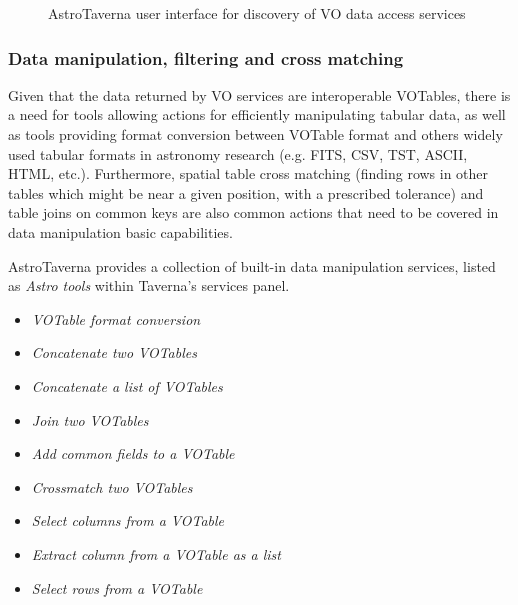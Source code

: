 \documentclass{aa}
\begin{document}
\begin{figure}[tb]
\centering 
{}
\caption{AstroTaverna user interface for discovery of VO data access services}
\label{fig:VODiscovery}
\end{figure}

\subsubsection{Data manipulation, filtering and cross matching}
\label{DataManipulation}

Given that the data returned by VO services are interoperable VOTables, there is a need for tools allowing actions for efficiently manipulating tabular data, as well as tools providing format conversion between VOTable format and others widely used tabular formats in astronomy research (e.g. FITS, CSV, TST, ASCII, HTML, etc.). Furthermore, spatial table cross matching (finding rows in other tables which might be near a given position, with a prescribed tolerance) and table joins on common keys are also common actions that need to be covered in data manipulation basic capabilities.

AstroTaverna provides a collection of built-in data manipulation services, listed as \textit{Astro tools} within Taverna's services panel.
\begin{itemize}
\item \textit{VOTable format conversion}
\item \textit{Concatenate two VOTables}
\item \textit{Concatenate a list of VOTables}
\item \textit{Join two VOTables}
\item \textit{Add common fields to a VOTable}
\item \textit{Crossmatch two VOTables}
\item \textit{Select columns from a VOTable}
\item \textit{Extract column from a VOTable as a list}
\item \textit{Select rows from a VOTable}
\end{itemize}
\end{document}
